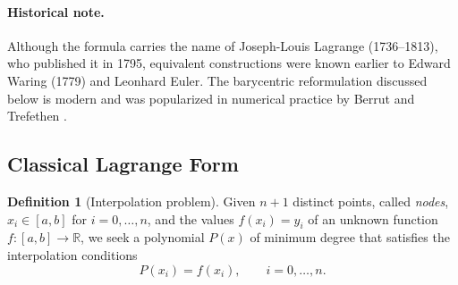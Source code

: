 \documentclass[12pt, a4paper]{article}
\theoremstyle{plain}
\theoremstyle{definition}
\newtheorem{definition}[theorem]{Definition}
\theoremstyle{remark}
\begin{document}
\paragraph{Historical note.} Although the formula carries the name of Joseph-Louis Lagrange (1736--1813), who published it in 1795, equivalent constructions were known earlier to Edward Waring (1779) and Leonhard Euler. The barycentric reformulation discussed below is modern and was popularized in numerical practice by Berrut and Trefethen \cite{berrut}.

\subsection{Classical Lagrange Form}

\begin{definition}[Interpolation problem]
Given $n+1$ distinct points, called \emph{nodes}, $x_i \in [a,b]$ for $i = 0, \dots, n$, and the values $f(x_i) = y_i$ of an unknown function $f: [a,b] \rightarrow \mathbb{R}$, we seek a polynomial $P(x)$ of minimum degree that satisfies the interpolation conditions
\begin{equation}\label{eq:interp-cond}
    P(x_i) = f(x_i), \qquad i = 0, \dots, n .
\end{equation}
\end{definition}
\end{document}
